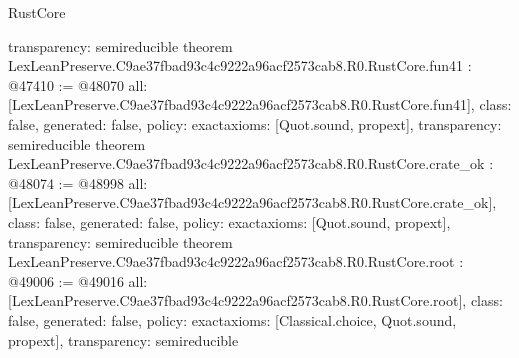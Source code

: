 \begin{lexlean}{RustCore}
\begin{coremodule}
{  transparency: semireducible
}
theorem LexLeanPreserve.C9ae37fbad93c4c9222a96acf2573cab8.R0.RustCore.fun41 : @47410 := @48070 {
  all: [LexLeanPreserve.C9ae37fbad93c4c9222a96acf2573cab8.R0.RustCore.fun41],
  class: false,
  generated: false,
  policy: exact{axioms: [Quot.sound, propext]},
  transparency: semireducible
}
theorem LexLeanPreserve.C9ae37fbad93c4c9222a96acf2573cab8.R0.RustCore.crate_ok : @48074 := @48998 {
  all: [LexLeanPreserve.C9ae37fbad93c4c9222a96acf2573cab8.R0.RustCore.crate_ok],
  class: false,
  generated: false,
  policy: exact{axioms: [Quot.sound, propext]},
  transparency: semireducible
}
theorem LexLeanPreserve.C9ae37fbad93c4c9222a96acf2573cab8.R0.RustCore.root : @49006 := @49016 {
  all: [LexLeanPreserve.C9ae37fbad93c4c9222a96acf2573cab8.R0.RustCore.root],
  class: false,
  generated: false,
  policy: exact{axioms: [Classical.choice, Quot.sound, propext]},
  transparency: semireducible
}


\end{coremodule}
\end{lexlean}
